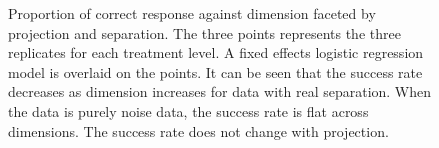 
\begin{figure}[ht]
   \centering
      \caption{Proportion of correct response against dimension faceted by projection and separation. The three points represents the three replicates for each treatment level. A fixed effects logistic regression model is overlaid on the points. It can be seen that the success rate decreases as dimension increases for data with real separation. When the data is purely noise data, the success rate is flat across dimensions. The success rate does not change with projection.  }
       \label{suc-rate-glm}
\end{figure}

